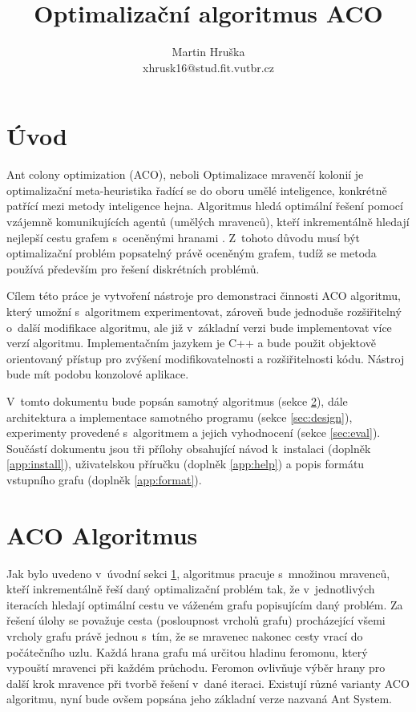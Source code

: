 \documentclass[a4paper, 12pt]{article}
\title{Optimalizační algoritmus ACO}
\author{Martin Hruška\\xhrusk16@stud.fit.vutbr.cz}
\date{}
\begin{document}
\maketitle

\section{Úvod}
\label{sec:intro}
Ant colony optimization (ACO), neboli Optimalizace mravenčí kolonií je optimalizační meta-heuristika řadící se do oboru umělé inteligence,
konkrétně patřící mezi metody inteligence hejna. Algoritmus hledá optimální řešení pomocí vzájemně komunikujících agentů (umělých mravenců), kteří
inkrementálně hledají nejlepší cestu grafem s~oceněnými hranami \cite{aco:main}. 
Z~tohoto důvodu musí být optimalizační problém popsatelný právě oceněným grafem, tudíž se metoda používá především pro řešení diskrétních problémů.

Cílem této práce je vytvoření nástroje pro demonstraci činnosti ACO algoritmu, který umožní s~algoritmem experimentovat, zároveň bude jednoduše rozšiřitelný
o~další modifikace algoritmu, ale již v~základní verzi bude implementovat více verzí algoritmu. Implementačním jazykem je C++ a bude použit objektově orientovaný
přístup pro zvýšení modifikovatelnosti a rozšiřitelnosti kódu. Nástroj bude mít podobu konzolové aplikace.

V~tomto dokumentu bude popsán samotný algoritmus (sekce \ref{sec:algorithm}), dále architektura a implementace samotného programu (sekce \ref{sec:design}),
experimenty provedené s~algoritmem a jejich vyhodnocení (sekce \ref{sec:eval}).
Součástí dokumentu jsou tři přílohy obsahující návod k~instalaci (doplněk \ref{app:install}),
uživatelskou příručku (doplněk \ref{app:help}) a popis formátu vstupního grafu (doplněk \ref{app:format}).

\section{ACO Algoritmus}
\label{sec:algorithm}
Jak bylo uvedeno v~úvodní sekci \ref{sec:intro}, algoritmus pracuje s~množinou mravenců, kteří inkrementálně řeší daný optimalizační problém tak, že
v~jednotlivých iteracích hledají optimální cestu ve váženém grafu popisujícím daný problém. Za řešení úlohy se považuje cesta (posloupnost vrcholů grafu)
procházející všemi vrcholy grafu právě
jednou s~tím, že se mravenec nakonec cesty vrací do počátečního uzlu. Každá hrana grafu má určitou hladinu feromonu, který vypouští mravenci při každém průchodu.
Feromon  ovlivňuje výběr hrany pro další krok mravence při tvorbě řešení v~dané iteraci.
Existují různé varianty ACO algoritmu, nyní bude ovšem popsána jeho základní verze nazvaná Ant System.
\end{document}
